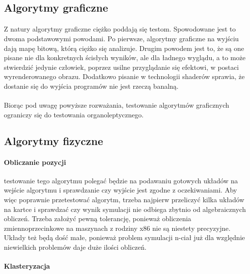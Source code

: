 \subsection{Algorytmy graficzne}\label{sub:grafika}

\paragraph{}

Z natury algorytmy graficzne ciężko poddają się testom. Spowodowane jest to dwoma podstawowymi powodami. Po pierwsze, algorytmy graficzne na wyjściu dają mapę bitową, którą ciężko się analizuje. Drugim powodem jest to, że są one pisane nie dla konkretnych ścisłych wyników, ale dla ładnego wyglądu, a to może stwierdzić jedynie człowiek, poprzez usilne przyglądanie się efektowi, w postaci wyrenderowanego obrazu. Dodatkowo pisanie w technologii shaderów sprawia, że dostanie się do wyjścia programów nie jest rzeczą banalną. 

\paragraph{}

Biorąc pod uwagę powyższe rozważania, testowanie algorytmów graficznych ograniczy się do testowania organoleptycznego.

\subsection{Algorytmy fizyczne}\label{sub:algorytmy fizyczne}

\paragraph{Obliczanie pozycji}

testowanie tego algorytmu polegać będzie na podawaniu gotowych układów na wejście algorytmu i sprawdzanie czy wyjście jest zgodne z oczekiwaniami. Aby więc poprawnie przetestować algorytm, trzeba najpierw przeliczyć kilka układów na kartce i sprawdzać czy wynik symulacji nie odbiega zbytnio od algebraicznych obliczeń. Trzeba założyć pewną tolerancję, ponieważ obliczenia zmiennoprzecinkowe na maszynach z rodziny x86 nie są niestety precyzyjne. Układy też będą dość małe, ponieważ problem symulacji n-ciał już dla względnie niewielkich problemów daje duże ilości obliczeń.

\paragraph{Klasteryzacja}

